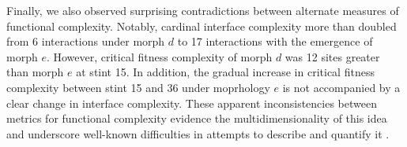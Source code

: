 Finally, we also observed surprising contradictions between alternate measures of functional complexity.
Notably, cardinal interface complexity more than doubled from 6 interactions under morph $d$ to 17 interactions with the emergence of morph $e$.
However, critical fitness complexity of morph $d$ was 12 sites greater than morph $e$ at stint 15.
In addition, the gradual increase in critical fitness complexity between stint 15 and 36 under moprhology $e$ is not accompanied by a clear change in interface complexity.
These apparent inconsistencies between metrics for functional complexity evidence the multidimensionality of this idea and underscore well-known difficulties in attempts to describe and quantify it \citep{bottcher2018molecules}.
